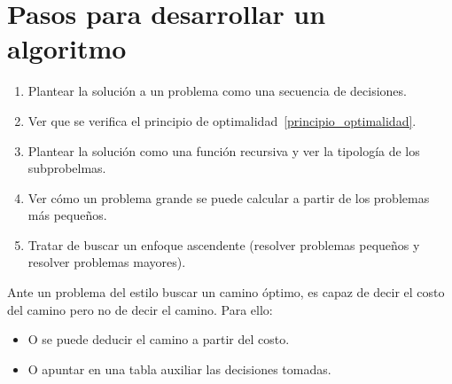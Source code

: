 \section{Pasos para desarrollar un algoritmo}
\begin{enumerate}
    \item Plantear la solución a un problema como una secuencia de decisiones.
    \item Ver que se verifica el principio de optimalidad~\ref{principio_optimalidad}.
    \item Plantear la solución como una función recursiva y ver la tipología de los subprobelmas.
    \item Ver cómo un problema grande se puede calcular a partir de los problemas más pequeños.
    \item Tratar de buscar un enfoque ascendente (resolver problemas pequeños y resolver problemas mayores).
\end{enumerate}
Ante un problema del estilo buscar un camino óptimo, es capaz de decir el costo del camino pero no de decir el camino. Para ello:
\begin{itemize}
    \item O se puede deducir el camino a partir del costo.
    \item O apuntar en una tabla auxiliar las decisiones tomadas.
\end{itemize}



